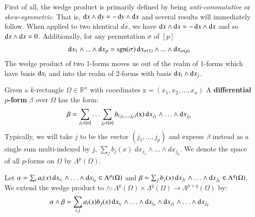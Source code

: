 First of all, the wedge product is primarily defined by being \emph{anti-commutative} or \emph{skew-symmetric}.
That is, $\mathop{}\!\mathrm{d} x \wedge \mathop{}\!\mathrm{d} y = -\mathop{}\!\mathrm{d} y \wedge \mathop{}\!\mathrm{d} x$ and several results will immediately follow.
When applied to two identical $dx$, we have $\mathop{}\!\mathrm{d} x \wedge \mathop{}\!\mathrm{d} x = - \mathop{}\!\mathrm{d} x \wedge \mathop{}\!\mathrm{d} x$ 
and so $\mathop{}\!\mathrm{d} x \wedge \mathop{}\!\mathrm{d} x = 0$.
Additionally, for any permutation $\sigma$ of $[p]$
\begin{equation}
	\mathop{}\!\mathrm{d} x_1 \wedge ... \wedge \mathop{}\!\mathrm{d} x_p 
	= \text{sgn}(\sigma) \mathop{}\!\mathrm{d} x_{\sigma(1)} \wedge ... \wedge \mathop{}\!\mathrm{d} x_{\sigma(p)}
\end{equation}
The wedge product of two 1-forms moves us out of the realm of 1-forms which have basis $\mathop{}\!\mathrm{d} x_i$ and into the 
realm of 2-forms with basis $\mathop{}\!\mathrm{d} x_i \wedge \mathop{}\!\mathrm{d} x_j$.


\begin{definition}
	Given a $k$-rectangle $\Omega \in \mathbb{R}^n$ with coordinates $\text{x} = (x_1, x_2, \ldots, x_n)$
	A \textbf{differential $p$-form} $\beta$ over $\Omega$ has the form:
	\begin{equation}
		\beta = \sum_{j_1 \in [n]} \ldots \sum_{j_p \in [n]} b_{(j_1, \ldots, j_p)}(\text{x})
				\mathop{}\!\mathrm{d} x_{j_1} \wedge \ldots \wedge \mathop{}\!\mathrm{d} x_{j_p}
	\end{equation}
	Typically, we will take $j$ to be the vector $(j_1, \ldots, j_p)$ 
	and express $\beta$ instead as a single sum multi-indexed
	by $j$, $\sum_j b_j(x) \; dx_{j_1} \wedge \ldots \wedge dx_{j_p}$.
	We denote the space of all $p$-forms on $\Omega$ by $\Lambda^p(\Omega)$.
\end{definition}


\begin{definition}
	Let $\alpha = \sum_i a_i(x) \mathop{}\!\mathrm{d} x_{i_1} \wedge \ldots \wedge \mathop{}\!\mathrm{d} x_{i_p} \in \Lambda^p(\Omega)$ 
	and $\beta = \sum_j b_j(x) \mathop{}\!\mathrm{d} x_{j_1} \wedge \ldots \wedge \mathop{}\!\mathrm{d} x_{j_q} \in \Lambda^q(\Omega)$. 
	We extend the wedge product to 
	$\wedge : \Lambda^p(\Omega) \times \Lambda^q(\Omega) \to \Lambda^{p+q}(\Omega)$ by:
	\begin{equation}
		\alpha \wedge \beta  = \sum_{i,j} a_i(x) b_j(x)
			\mathop{}\!\mathrm{d} x_{i_1} \wedge \ldots \wedge \mathop{}\!\mathrm{d} x_{i_p} \wedge 
			\mathop{}\!\mathrm{d} x_{j_1} \wedge \ldots \wedge \mathop{}\!\mathrm{d} x_{j_q}
	\end{equation}
\end{definition}

